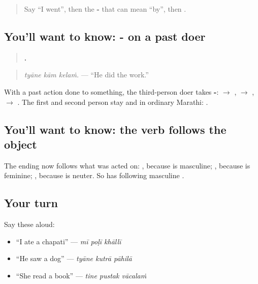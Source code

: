 \label{lesson:MR-C159-tyane-kela}



\begin{quote}
Say \textquotedblleft{}I went\textquotedblright{}, then the \textbf{-} that can mean \textquotedblleft{}by\textquotedblright{}, then \textbf{}.
\end{quote}

\subsection*{You'll want to know: - on a past doer}
\begin{quote}
\textbf{  .}
\end{quote}

\begin{quote}
\emph{tyāne kām kelaṁ.} — \textquotedblleft{}He did the work.\textquotedblright{}
\end{quote}

With a past action done to something, the third-person doer takes \textbf{-}: \textbf{ $\to$ }, \textbf{ $\to$ }, \textbf{ $\to$ }. The first and second person stay \textbf{} and \textbf{} in ordinary Marathi: \textbf{  }.

\subsection*{You'll want to know: the verb follows the object}
The ending now follows what was acted on: \textbf{  }, because \textbf{} is masculine; \textbf{  }, because \textbf{} is feminine; \textbf{  }, because \textbf{} is neuter. So \textbf{  } has \textbf{} following masculine \textbf{}.

\subsection*{Your turn}
Say these aloud:

\begin{itemize}
\raggedright
  \item \textquotedblleft{}I ate a chapati\textquotedblright{} — \emph{mī poḷī khāllī}
  \item \textquotedblleft{}He saw a dog\textquotedblright{} — \emph{tyāne kutrā pāhilā}
  \item \textquotedblleft{}She read a book\textquotedblright{} — \emph{tine pustak vācalaṁ}
\end{itemize}

